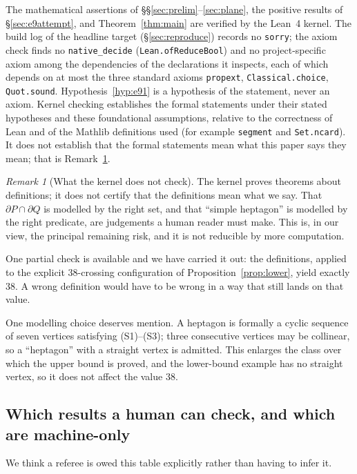\documentclass[11pt,a4paper]{article}
\theoremstyle{plain}
\theoremstyle{definition}
\theoremstyle{remark}
\newtheorem{remark}[theorem]{Remark}
\begin{document}
The mathematical assertions of \S\S\ref{sec:prelim}--\ref{sec:plane}, the
positive results of \S\ref{sec:e9attempt}, and Theorem~\ref{thm:main} are
verified by the Lean~4 kernel. The build log of the headline target
(\S\ref{sec:reproduce}) records no \texttt{sorry}; the axiom check finds no
\texttt{native\_decide} (\texttt{Lean.ofReduceBool}) and no project-specific
axiom among the dependencies of the declarations it inspects, each of which
depends on at most the three standard axioms \texttt{propext},
\texttt{Classical.choice}, \texttt{Quot.sound}. Hypothesis~\ref{hyp:e91} is a
hypothesis of the statement, never an axiom. Kernel checking establishes the
formal statements under their stated hypotheses and these foundational
assumptions, relative to the correctness of Lean and of the Mathlib
definitions used (for example \texttt{segment} and \texttt{Set.ncard}). It
does not establish that the formal statements mean what this paper says they
mean; that is Remark~\ref{rem:faithful}.

\begin{remark}[What the kernel does not check]\label{rem:faithful}
The kernel proves theorems about definitions; it does not certify that the
definitions mean what we say. That $\partial P\cap\partial Q$ is modelled by the
right set, and that ``simple heptagon'' is modelled by the right predicate,
are judgements a human reader must make. This is, in our view, the principal
remaining risk, and it is not reducible by more computation.

One partial check is available and we have carried it out: the definitions,
applied to the explicit $38$-crossing configuration of
Proposition~\ref{prop:lower}, yield exactly $38$. A wrong definition would have
to be wrong in a way that still lands on that value.

One modelling choice deserves mention. A heptagon is formally a cyclic
sequence of seven vertices satisfying (S1)--(S3); three consecutive vertices
may be collinear, so a ``heptagon'' with a straight vertex is admitted. This
enlarges the class over which the upper bound is proved, and the lower-bound
example has no straight vertex, so it does not affect the value $38$.
\end{remark}

\subsection{Which results a human can check, and which are machine-only}

We think a referee is owed this table explicitly rather than having to infer it.
\end{document}
